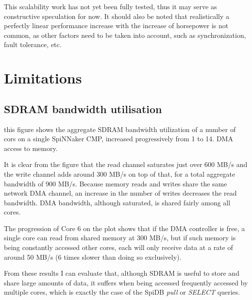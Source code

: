 This scalability work has not yet been fully tested, thus it may serve as constructive speculation for now. It should also be noted that realistically a perfectly linear performance increase with the increase of horsepower is not common, as other factors need to be taken into account, such as synchronization, fault tolerance, etc.





\section{Limitations}
\label{sec:limitations}

\subsection{SDRAM bandwidth utilisation}

this figure shows the aggregate SDRAM bandwidth utilization of a number of cors on a single SpiNNaker CMP, increased progressively from 1 to 14. DMA access to memory.

It is clear from the figure that the read channel saturates just over 600 MB/s and the write channel adds around 300 MB/s on top of that, for a total aggregate bandwidth of 900 MB/s. Because memory reads and writes share the same network DMA channel, an increase in the number of writes decreases the read bandwidth. DMA bandwidth, although saturated, is shared fairly among all cores. 

The progression of Core 6 on the plot shows that if the DMA controller is free, a single core can read from shared memory at 300 MB/s, but if such memory is being constantly accessed other cores, each will only receive data at a rate of around 50 MB/s (6 times slower than doing so exclusively).

From these results I can evaluate that, although SDRAM is useful to store and share large amounts of data, it suffers when being accessed frequently accessed by multiple cores, which is exactly the case of the SpiDB \textit{pull} or \textit{SELECT} queries.


